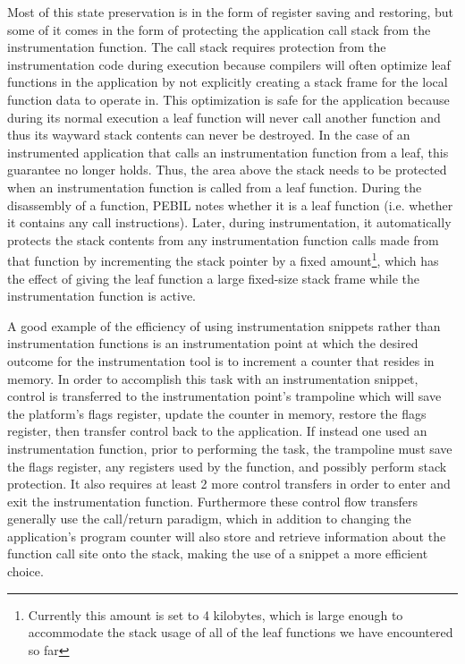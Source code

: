 Most of this state preservation is in the form of register saving and restoring,
but some of it comes in the form of protecting the application call stack from
the instrumentation function. The call stack requires protection from the
instrumentation code during execution because compilers will often optimize leaf
functions in the application by not explicitly creating a stack frame for the
local function data to operate in. This optimization is safe for the application
because during its normal execution a leaf function will never call another
function and thus its wayward stack contents can never be destroyed. In the case
of an instrumented application that calls an instrumentation function from a
leaf, this guarantee no longer holds. Thus, the area above the stack needs to be
protected when an instrumentation function is called from a leaf function.
During the disassembly of a function, PEBIL notes whether it is a leaf function
(i.e. whether it contains any call instructions). Later, during instrumentation,
it automatically protects the stack contents from any instrumentation function
calls made from that function by incrementing the stack pointer by a fixed
amount\footnote{Currently this amount is set to 4 kilobytes, which is large
enough to accommodate the stack usage of all of the leaf functions we have
encountered so far}, which has the effect of giving the leaf function a large
fixed-size stack frame while the instrumentation function is active.

A good example of the efficiency of using instrumentation snippets rather than
instrumentation functions is an instrumentation point at which the desired
outcome for the instrumentation tool is to increment a counter that resides in
memory. In order to accomplish this task with an instrumentation snippet,
control is transferred to the instrumentation point's trampoline which will save
the platform's flags register, update the counter in memory, restore the flags
register, then transfer control back to the application. If instead one used an
instrumentation function, prior to performing the task, the trampoline must save
the flags register, any registers used by the function, and possibly perform
stack protection. It also requires at least 2 more control transfers in order to
enter and exit the instrumentation function. Furthermore these control flow
transfers generally use the call/return paradigm, which in addition to changing
the application's program counter will also store and retrieve information about
the function call site onto the stack, making the use of a snippet a more
efficient choice.

